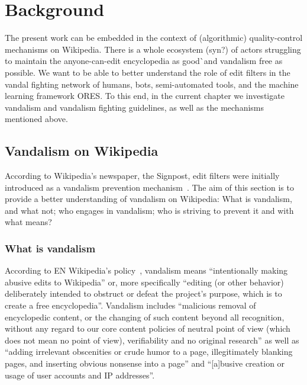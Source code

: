\chapter{Background}
\label{chap:background}

The present work can be embedded in the context of (algorithmic) quality-control mechanisms on Wikipedia.
There is a whole ecosystem (syn?) of actors struggling to maintain the anyone-can-edit encyclopedia as good^^ and vandalism free as possible.
We want to be able to better understand the role of edit filters in the vandal fighting network of humans, bots, semi-automated tools, and the machine learning framework ORES.
To this end, in the current chapter we investigate vandalism and vandalism fighting guidelines, as well as the mechanisms mentioned above.

\section{Vandalism on Wikipedia}

According to Wikipedia's newspaper, the Signpost, edit filters were initially introduced as a vandalism prevention mechanism~\cite{Signpost2009}.
The aim of this section is to provide a better understanding of vandalism on Wikipedia: What is vandalism, and what not; who engages in vandalism; who is striving to prevent it and with what means?

\subsection{What is vandalism}

According to EN Wikipedia's policy~\cite{Wikipedia:Vandalism}, vandalism means ``intentionally making abusive edits to Wikipedia'' or, more specifically ``editing (or other behavior) deliberately intended to obstruct or defeat the project's purpose, which is to create a free encyclopedia''.
Vandalism includes ``malicious removal of encyclopedic content, or the changing of such content beyond all recognition, without any regard to our core content policies of neutral point of view (which does not mean no point of view), verifiability and no original research''
as well as ``adding irrelevant obscenities or crude humor to a page, illegitimately blanking pages, and inserting obvious nonsense into a page''
and ``[a]busive creation or usage of user accounts and IP addresses''.

